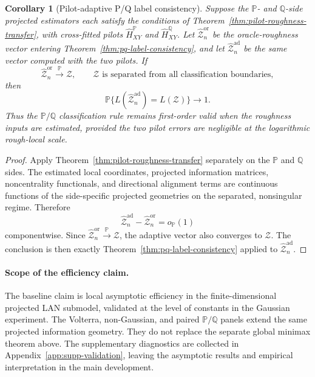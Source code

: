 \documentclass[11pt,a4paper]{amsart}
\theoremstyle{plain}
\newtheorem{corollary}[theorem]{Corollary}
\theoremstyle{definition}
\theoremstyle{remark}
\newcommand{\PP}{\mathbb{P}}
\newcommand{\QQ}{\mathbb{Q}}
\newcommand{\toP}{\xrightarrow{\PP}}
\begin{document}
\begin{corollary}[Pilot-adaptive P/Q label consistency]\label{cor:pilot-adaptive-pq-labels}
Suppose the \(\PP\)- and \(\QQ\)-side projected estimators each satisfy the conditions of
Theorem~\ref{thm:pilot-roughness-transfer}, with cross-fitted pilots
\(\widehat H_{XY}^{\PP}\) and \(\widehat H_{XY}^{\QQ}\).  Let
\(\widehat{\mathcal Z}_n^{\mathrm{or}}\) be the oracle-roughness vector entering
Theorem~\ref{thm:pq-label-consistency}, and let
\(\widehat{\mathcal Z}_n^{\mathrm{ad}}\) be the same vector computed with the two pilots.  If
\[
        \widehat{\mathcal Z}_n^{\mathrm{or}}\toP\mathcal Z,
        \qquad
        \mathcal Z
        \text{ is separated from all classification boundaries},
\]
then
\[
        \PP\{L(\widehat{\mathcal Z}_n^{\mathrm{ad}})=L(\mathcal Z)\}\to1.
\]
Thus the \(\PP/\QQ\) classification rule remains first-order valid when the roughness inputs are
estimated, provided the two pilot errors are negligible at the logarithmic rough-local scale.
\end{corollary}

\begin{proof}
Apply Theorem~\ref{thm:pilot-roughness-transfer} separately on the \(\PP\) and \(\QQ\) sides.  The
estimated local coordinates, projected information matrices, noncentrality functionals, and
directional alignment terms are continuous functions of the side-specific projected geometries on
the separated, nonsingular regime.  Therefore
\[
        \widehat{\mathcal Z}_n^{\mathrm{ad}}
        -
        \widehat{\mathcal Z}_n^{\mathrm{or}}
        =
        o_{\PP}(1)
\]
componentwise.  Since \(\widehat{\mathcal Z}_n^{\mathrm{or}}\toP\mathcal Z\), the adaptive vector
also converges to \(\mathcal Z\).  The conclusion is then exactly
Theorem~\ref{thm:pq-label-consistency} applied to
\(\widehat{\mathcal Z}_n^{\mathrm{ad}}\).
\end{proof}

\paragraph{Scope of the efficiency claim.}
The baseline claim is local asymptotic efficiency in the finite-dimensional projected LAN submodel,
validated at the level of constants in the Gaussian experiment.  The Volterra, non-Gaussian, and
paired \(\PP/\QQ\) panels extend the same projected information geometry.  They do not replace the
separate global minimax theorem above.  The supplementary diagnostics are collected in
Appendix~\ref{app:supp-validation}, leaving the asymptotic results and empirical interpretation in
the main development.
\end{document}
